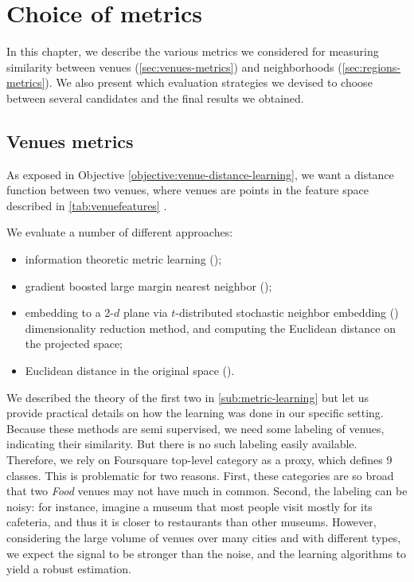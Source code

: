 \chapter{Choice of metrics}
\label{chap:metric}

In this chapter, we describe the various metrics we considered for measuring
similarity between venues (\autoref{sec:venues-metrics}) and neighborhoods
(\autoref{sec:regions-metrics}). We also present which evaluation strategies we
devised to choose between several candidates and the final results we obtained.

\section{Venues metrics}
\label{sec:venues-metrics}

As exposed in Objective \ref{objective:venue-distance-learning}, we want a
distance function between two venues, where venues are points in the feature
space described in \autoref{tab:venuefeatures} .

We evaluate a number of different approaches:
\begin{itemize}
	\item
		information theoretic metric learning (\itml);
	\item
		gradient boosted large margin nearest neighbor (\lmnn);
	\item
		embedding to a 2-$d$ plane via $t$-distributed stochastic neighbor
		embedding (\tsne) dimensionality reduction method, and computing the
		Euclidean distance on the projected space; 
	\item 
		Euclidean distance in the original space (\eucl).
\end{itemize}		

We described the theory of the first two in \autoref{sub:metric-learning} but
let us provide practical details on how the learning was done in our specific
setting. Because these methods are semi supervised, we need some labeling of
venues, indicating their similarity. But there is no such labeling easily
available. Therefore, we rely on Foursquare top-level category as a proxy,
which defines 9 classes. This is problematic for two reasons. First, these
categories are so broad that two \emph{Food} venues may not have much in
common. Second, the labeling can be noisy: for instance, imagine a museum that
most people visit mostly for its cafeteria, and thus it is closer to
restaurants than other museums.  However, considering the large volume of
venues over many cities and with different types, we expect the signal to be
stronger than the noise, and the learning algorithms to yield a robust
estimation. 

